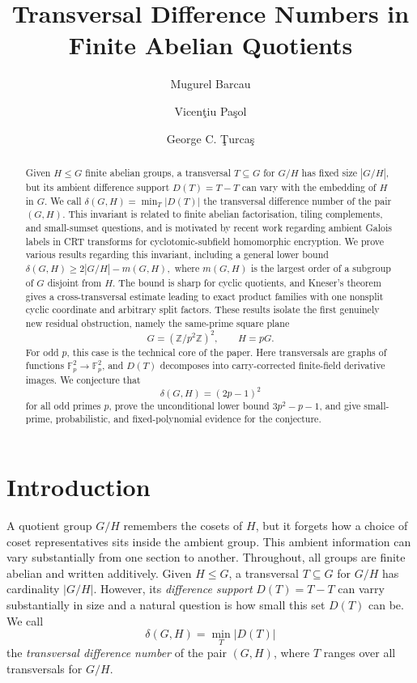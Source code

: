 \documentclass[reqno]{amsart}
\title[Transversal Difference Numbers]{Transversal Difference Numbers in Finite Abelian Quotients}
\author[M. Barcau \and V. Pa\c sol]{Mugurel Barcau \and
Vicen\c tiu Pa\c sol}
\author[G. C. \c Turca\c s]{George C. \c Turca\c s}
\numberwithin{equation}{section}
\theoremstyle{definition}
\begin{document}
             




\begin{abstract}
Given \(H\leq G\) finite abelian groups,  a transversal \(T\subseteq G\) for
\(G/H\) has fixed size \(|G/H|\), but its ambient difference support
\(D(T)=T-T\) can vary with the embedding of \(H\) in \(G\).  We call
$
\delta(G,H)=\min_T |D(T)|
$
the transversal difference number of the pair \((G,H)\).  This invariant is
related to finite abelian factorisation, tiling complements, and small-sumset
questions, and is motivated by recent work regarding ambient Galois labels in CRT transforms for
cyclotomic-subfield homomorphic encryption.  We prove various results regarding this invariant, including a general lower bound
$\delta(G,H)\geq 2|G/H|-m(G,H),
$
where \(m(G,H)\) is the largest order of a subgroup of \(G\) disjoint from
\(H\).  The bound is sharp for cyclic quotients, and Kneser's theorem gives a
cross-transversal estimate leading to exact product families with one nonsplit
cyclic coordinate and arbitrary split factors.  These results isolate the first genuinely new residual obstruction, namely the
same-prime square plane
\[
G=(\mathbb Z/p^2\mathbb Z)^2,\qquad H=pG.
\]
For odd \(p\), this case is the technical core of the paper. Here transversals are
graphs of functions \(\mathbb F_p^2\to \mathbb F_p^2\), and \(D(T)\) decomposes into
carry-corrected finite-field derivative images. We conjecture that
\[
\delta(G,H)=(2p-1)^2
\]
for all odd primes \(p\), prove the unconditional lower bound \(3p^2-p-1\), and give
small-prime, probabilistic, and fixed-polynomial evidence for the conjecture.
\end{abstract}
\maketitle %



\section{Introduction}

A quotient group $G/H$ remembers the cosets of \(H\), but it forgets how a choice of
coset representatives sits inside the ambient group.  This ambient information
can vary substantially from one section to another.  Throughout, all groups are
finite abelian and written additively.  Given
\(H\leq G\),  a transversal
\(T\subseteq G\) for \(G/H\) has cardinality \(|G/H|\). However, its \emph{difference support} $D(T)= T-T$ can varry substantially in size and a natural question is how small this set $D(T)$ can be. We call
\[
        \delta(G,H)
        =
        \min_T |D(T)|
\]
the \emph{transversal difference number} of the pair \((G,H)\), where \(T\)
ranges over all transversals for \(G/H\).
\end{document}
